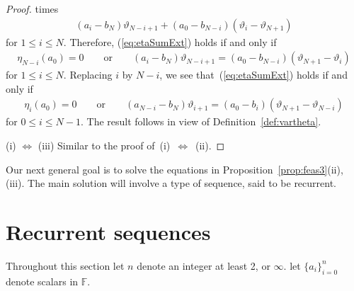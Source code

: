 \documentclass[pdftex]{sigma}
\numberwithin{equation}{section}
\begin{document}
\begin{proof}
times
\begin{gather*}
(a_{i}-b_N)\vartheta_{N-i+1}
+(a_0-b_{N-i})(\vartheta_{i}-\vartheta_{N+1})
\end{gather*}
for $1 \leq i \leq N$.
Therefore,
(\ref{eq:etaSumExt}) holds if and only if
\begin{gather*}
\eta_{N-i}(a_0)=0
\qquad \text{or}\qquad
(a_{i}-b_N)\vartheta_{N-i+1} = (a_0-b_{N-i})(\vartheta_{N+1}-\vartheta_{i})
\end{gather*}
for $1 \leq i \leq N$.
Replacing $i$ by $N-i$,
we see that~(\ref{eq:etaSumExt}) holds if and only if
\begin{gather*}
\eta_{i}(a_0)=0
\qquad \text{or}\qquad
(a_{N-i}-b_N)\vartheta_{i+1} = (a_0-b_{i})(\vartheta_{N+1}-\vartheta_{N-i})
\end{gather*}
for $0 \leq i \leq N-1$.
The result follows in view of
Definition~\ref{def:vartheta}.

(i) $\Leftrightarrow$ (iii) Similar to the proof of~(i)~$\Leftrightarrow$~(ii).
\end{proof}

Our next general goal is to solve the equations
in Proposition~\ref{prop:feas3}(ii), (iii). The main solution will involve a type
of sequence, said to be recurrent.

\section{Recurrent sequences}\label{section8}

 Throughout this section
let $n$ denote an integer at least 2, or $\infty$.
let $\lbrace a_i\rbrace_{i=0}^n$ denote
 scalars in $\mathbb F$.
\end{document}
